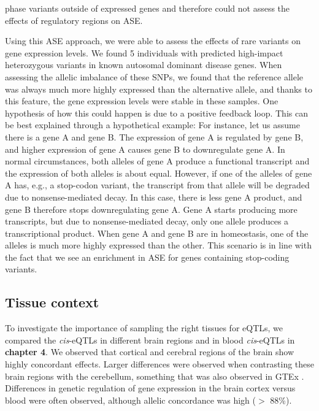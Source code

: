 phase variants outside of expressed genes and therefore could not assess the effects of regulatory regions on ASE.


Using this ASE approach, we were able to assess the effects of rare variants on gene expression levels. We found 5 individuals with predicted high-impact heterozygous variants in known autosomal dominant disease genes. When assessing the allelic imbalance of these SNPs, we found that the reference allele was always much more highly expressed than the alternative allele, and thanks to this feature, the gene expression levels were stable in these samples. One hypothesis of how this could happen is due to a positive feedback loop. This can be best explained through a hypothetical example: For instance, let us assume there is a gene A and gene B. The expression of gene A is regulated by gene B, and higher expression of gene A causes gene B to downregulate gene A. In normal circumstances, both alleles of gene A produce a functional transcript and the expression of both alleles is about equal. However, if one of the alleles of gene A has, e.g., a stop-codon variant, the transcript from that allele will be degraded due to nonsense-mediated decay. In this case, there is less gene A product, and gene B therefore stops downregulating gene A. Gene A starts producing more transcripts, but due to nonsense-mediated decay, only one allele produces a transcriptional product. When gene A and gene B are in homeostasis, one of the alleles is much more highly expressed than the other. This scenario is in line with the fact that we see an enrichment in ASE for genes containing stop-coding variants.


\subsection{Tissue context}
To investigate the importance of sampling the right tissues for eQTLs, we compared the \textit{cis}-eQTLs in different brain regions and in blood \textit{cis}-eQTLs in \textbf{chapter 4}. We observed that cortical and cerebral regions of the brain show highly concordant effects. Larger differences were observed when contrasting these brain regions with the cerebellum, something that was also observed in GTEx \cite{thegtexconsortiumGTExConsortiumAtlas2020}. Differences in genetic regulation of gene expression in the brain cortex versus blood were often observed, although allelic concordance was high ($>$ 88\%). 

